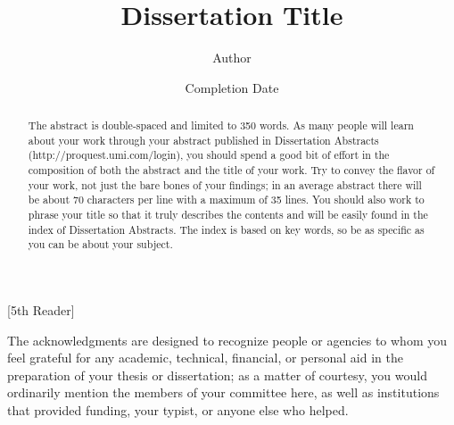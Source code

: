 \documentclass{iuphd}
\begin{document}
\title{Dissertation Title}
\author{Author}
\date{Completion Date}
\maketitle

[5th Reader]%

\copyrightpage


\begin{acknowledgments}
The acknowledgments are designed to recognize people or agencies to whom you feel grateful for any academic,
technical, financial, or personal aid in the preparation of your thesis or dissertation; as a matter of
courtesy, you would ordinarily mention the members of your committee here, as well as institutions that
provided funding, your typist, or anyone else who helped.
\end{acknowledgments}


\begin{abstract}
 The abstract is double-spaced and limited to 350 words. As many people will learn about
your work through your abstract published in Dissertation Abstracts (http://proquest.umi.com/login),
you should spend a good bit of effort in the composition of both the abstract and the title of your work.
Try to convey the flavor of your work, not just the bare bones of your findings; in an average abstract
there will be about 70 characters per line with a maximum of 35 lines. You should also work to phrase your
title so that it truly describes the contents and will be easily found in the index of Dissertation Abstracts.
The index is based on key words, so be as specific as you can be about your subject. 
\end{abstract}

\tableofcontents






%
\end{document}
